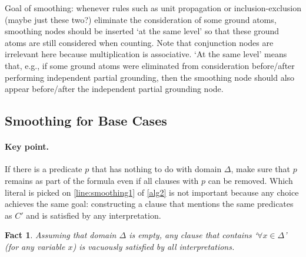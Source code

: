 \documentclass{article}
\newtheorem{fact}{Fact}
\theoremstyle{definition}
\begin{document}
Goal of smoothing: whenever rules such as unit propagation or
inclusion-exclusion (maybe just these two?) eliminate the consideration of some
ground atoms, smoothing nodes should be inserted `at the same level' so that
these ground atoms are still considered when counting. Note that conjunction
nodes are irrelevant here because multiplication is associative. `At the same
level' means that, e.g., if some ground atoms were eliminated from consideration
before/after performing independent partial grounding, then the smoothing node
should also appear before/after the independent partial grounding node.


\subsection{Smoothing for Base Cases}\label{sec:smoothingbase}

\paragraph{Key point.}
If there is a predicate $p$ that has nothing to do with domain $\Delta$, make
sure that $p$ remains as part of the formula even if all clauses with $p$ can be
removed. Which literal is picked on \cref{line:smoothing1} of \cref{alg2} is not
important because any choice achieves the same goal: constructing a clause that
mentions the same predicates as $C'$ and is satisfied by any interpretation.

\begin{fact}
  Assuming that domain $\Delta$ is empty, any clause that contains
  `$\forall x \in \Delta$' (for any variable $x$) is vacuously satisfied by all
  interpretations.
\end{fact}
\end{document}
